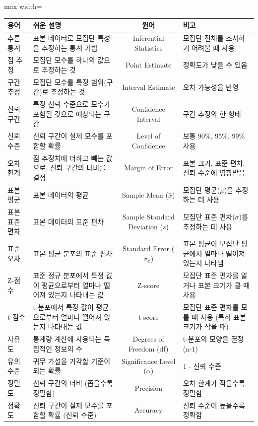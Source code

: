 \documentclass[11pt,a4paper]{article}
\begin{document}
\begin{adjustbox}{max width=\textwidth}
\begin{tabular}{llcl}
\toprule
\textbf{용어} & \textbf{쉬운 설명} & \textbf{원어} & \textbf{비고} \\
\midrule
추론 통계 & 표본 데이터로 모집단 특성을 추정하는 통계 기법 & Inferential Statistics & 모집단 전체를 조사하기 어려울 때 사용 \\
점 추정 & 모집단 모수를 하나의 값으로 추정하는 것 & Point Estimate & 정확도가 낮을 수 있음 \\
구간 추정 & 모집단 모수를 특정 범위(구간)로 추정하는 것 & Interval Estimate & 오차 가능성을 반영 \\
신뢰 구간 & 특정 신뢰 수준으로 모수가 포함될 것으로 예상되는 구간 & Confidence Interval & 구간 추정의 한 형태 \\
신뢰 수준 & 신뢰 구간이 실제 모수를 포함할 확률 & Level of Confidence & 보통 90\%, 95\%, 99\% 사용 \\
오차 한계 & 점 추정치에 더하고 빼는 값으로, 신뢰 구간의 너비를 결정 & Margin of Error & 표본 크기, 표준 편차, 신뢰 수준에 영향받음 \\
표본 평균 & 표본 데이터의 평균 & Sample Mean ($\bar{x}$) & 모집단 평균($\mu$)을 추정하는 데 사용 \\
표본 표준 편차 & 표본 데이터의 표준 편차 & Sample Standard Deviation ($s$) & 모집단 표준 편차($\sigma$)를 추정하는 데 사용 \\
표준 오차 & 표본 평균 분포의 표준 편차 & Standard Error ($\sigma_{\bar{x}}$) & 표본 평균이 모집단 평균에서 얼마나 떨어져 있는지 나타냄 \\
Z-점수 & 표준 정규 분포에서 특정 값이 평균으로부터 얼마나 떨어져 있는지 나타내는 값 & Z-score & 모집단 표준 편차를 알거나 표본 크기가 클 때 사용 \\
t-점수 & t-분포에서 특정 값이 평균으로부터 얼마나 떨어져 있는지 나타내는 값 & t-score & 모집단 표준 편차를 모를 때 사용 (특히 표본 크기가 작을 때) \\
자유도 & 통계량 계산에 사용되는 독립적인 정보의 수 & Degrees of Freedom (df) & t-분포의 모양을 결정 (n-1) \\
유의 수준 & 귀무 가설을 기각할 기준이 되는 확률 & Significance Level ($\alpha$) & 1 - 신뢰 수준 \\
정밀도 & 신뢰 구간의 너비 (좁을수록 정밀함) & Precision & 오차 한계가 작을수록 정밀함 \\
정확도 & 신뢰 구간이 실제 모수를 포함할 확률 (신뢰 수준) & Accuracy & 신뢰 수준이 높을수록 정확함 \\
\bottomrule
\end{tabular}
\end{adjustbox}
\end{document}
